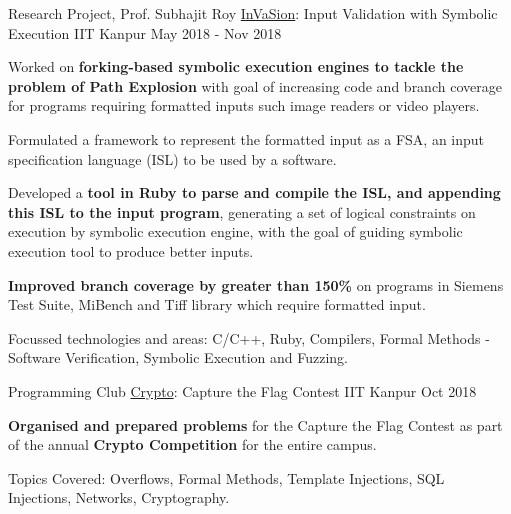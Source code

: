 \begin{cventries}
  \cventry
    {Research Project, Prof. Subhajit Roy} %
    {\href{https://arxiv.org/abs/2104.01438}{InVaSion}: Input Validation with Symbolic Execution} %
    {IIT Kanpur} %
    {May 2018 - Nov 2018} %
    {
      \begin{cvitems} %
      \item {Worked on \textbf{forking-based symbolic execution engines to tackle the problem of Path Explosion} with goal of increasing code and branch coverage for programs requiring formatted inputs such image readers or video players.}
      \item {Formulated a framework to represent the formatted input as a FSA, an input specification language (ISL) to be used by a software.}
        \item {Developed a \textbf{tool in Ruby to parse and compile the ISL, and appending this ISL to the input program}, generating a set of logical constraints on execution by symbolic execution engine, with the goal of guiding symbolic execution tool to produce better inputs.}
        \item {\textbf{Improved branch coverage by greater than 150\%} on programs in Siemens Test Suite, MiBench and Tiff library which require formatted input.}
        \item {Focussed technologies and areas: C/C++, Ruby, Compilers, Formal Methods - Software Verification, Symbolic Execution and Fuzzing.}
      \end{cvitems}
    }%



  \cventry
    {Programming Club} %
    {\href{https://github.com/pclubiitk/crypto-18}{Crypto}: Capture the Flag Contest} %
    {IIT Kanpur} %
    {Oct 2018} %
    {
      \begin{cvitems} %
      \item {\textbf{Organised and prepared problems} for the Capture the Flag Contest as part of the annual \textbf{Crypto Competition} for the entire campus.}
      \item {Topics Covered: Overflows, Formal Methods, Template Injections, SQL Injections, Networks, Cryptography.}
      \end{cvitems}
    }


\end{cventries}
